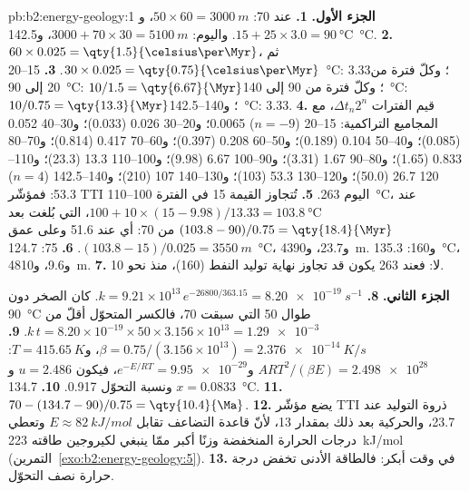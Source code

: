 \begin{solution}{pb:b2:energy-geology:1}
\noindent\textbf{الجزء الأول.}
\textbf{1.} عند \qty{70}{\Ma}: $50 \times 60 = \qty{3000}{m}$، و$15 + 25 \times 3.0 =
\qty{90}{\celsius}$. واليوم: $3000 + 70 \times 30 = \qty{5100}{m}$، و\qty{142.5}{\celsius}.
\textbf{2.} $60 \times 0.025 = \qty{1.5}{\celsius\per\Myr}$، ثم $30 \times 0.025 =
\qty{0.75}{\celsius\per\Myr}$.
\textbf{3.} 15--\qty{20}{\celsius}: \qty{3.33}{\Myr}؛ وكلّ فترة من 20 إلى \qty{90}{\celsius}:
$10/1.5 = \qty{6.67}{\Myr}$؛ وكلّ فترة من 90 إلى \qty{140}{\celsius}: $10/0.75 = \qty{13.3}{\Myr}$؛
و140--\qty{142.5}{\celsius}: \qty{3.33}{\Myr}.
\textbf{4.} قيم الفترات $\Delta t_n 2^n$، مع المجاميع التراكمية: 15--20 ($n = -9$) 0.0065؛ و20--30
0.026 (0.033)؛ و30--40 0.052 (0.085)؛ و40--50 0.104 (0.189)؛ و50--60 0.208 (0.397)؛ و60--70 0.417
(0.814)؛ و70--80 0.833 (1.65)؛ و80--90 1.67 (3.31)؛ و90--100 6.67 (9.98)؛ و100--110 13.3 (23.3)؛
و110--120 26.7 (50.0)؛ و120--130 53.3 (103)؛ و130--140 107 (210)؛ و140--142.5 ($n = 4$) 53.3: فمؤشّر TTI
اليوم 263.
\textbf{5.} تُتجاوز القيمة 15 في الفترة 100--\qty{110}{\celsius}، عند $100 + 10 \times
(15 - 9.98)/13.33 = \qty{103.8}{\celsius}$، التي بُلغت بعد $(103.8 - 90)/0.75 = \qty{18.4}{\Myr}$ من
\qty{70}{\Ma}: أي عند \qty{51.6}{\Ma} وعلى عمق $(103.8 - 15)/0.025 = \qty{3550}{m}$.
\textbf{6.} 75: \qty{124.7}{\celsius}، و\qty{23.7}{\Ma}، و\qty{4390}{m}. و160: \qty{135.3}{\celsius}،
و\qty{9.6}{\Ma}، و\qty{4810}{m}.
\textbf{7.} لا: فعند 263 يكون قد تجاوز نهاية توليد النفط (160)، منذ نحو \qty{10}{\Ma}.

\noindent\textbf{الجزء الثاني.}
\textbf{8.} $k = 9.21 \times 10^{13}\,e^{-26800/363.15} = \qty{8.20e-19}{s^{-1}}$. كان الصخر
دون \qty{90}{\celsius} طوال \qty{50}{\Myr} التي سبقت \qty{70}{\Ma}، فالكسر المتحوّل
أقلّ من $k\,t = 8.20 \times 10^{-19} \times 50 \times 3.156 \times 10^{13} = \num{1.29e-3}$.
\textbf{9.} $\beta = 0.75/(3.156 \times 10^{13}) = \qty{2.376e-14}{K/s}$، و$T = \qty{415.65}{K}$:
$ART^2/(\beta E) = \num{2.498e28}$ و$e^{-E/RT} = \num{9.95e-29}$، فيكون $u = 2.486$ و$x = 0.0833$
ونسبة التحوّل 0.917.
\textbf{10.} \qty{134.7}{\celsius}.
\textbf{11.} $70 - (134.7 - 90)/0.75 = \qty{10.4}{\Ma}$.
\textbf{12.} يضع مؤشّر TTI ذروة التوليد عند \qty{23.7}{\Ma}، والحركية بعد ذلك بمقدار \qty{13}{\Myr}،
لأنّ قاعدة التضاعف تقابل $E \approx \qty{82}{kJ/mol}$ وتعطي درجات الحرارة المنخفضة وزنًا
أكبر ممّا ينبغي لكيروجين طاقته \qty{223}{kJ/mol} (التمرين~\ref{exo:b2:energy-geology:5}).
\textbf{13.} في وقت أبكر: فالطاقة الأدنى تخفض درجة حرارة نصف التحوّل.


\end{solution}
